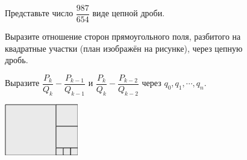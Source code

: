 \begin{figure}[H]
    \begin{minipage}{0.8\linewidth}
        \begin{thm}
            Представьте число $\dfrac{987}{654}$ виде цепной дроби.
        \end{thm}
        
        \begin{thm}
            Выразите отношение сторон прямоугольного поля, разбитого на квадратные участки (план изображён на рисунке), через цепную дробь.
        \end{thm}
        
        \begin{thm}
            Выразите $\dfrac{P_k}{Q_k} - \dfrac{P_{k - 1}}{Q_{k - 1}}$ и $\dfrac{P_k}{Q_k} - \dfrac{P_{k - 2}}{Q_{k - 2}}$ через $q_0, q_1, \cdots, q_n$. 
        \end{thm}
    \end{minipage}
\hfill
    \begin{minipage}{0.19\linewidth}
        \includegraphics[width=0.95\columnwidth]{img/11.3 img1.png}
    \end{minipage}
\end{figure}

\begin{center}
\end{center}


